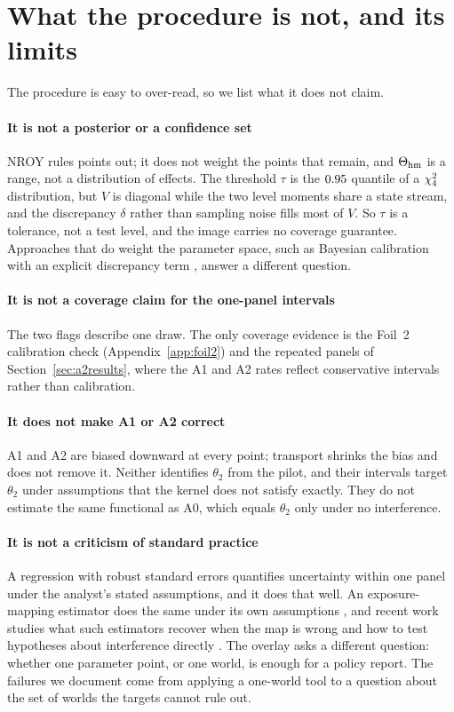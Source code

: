 \section{What the procedure is not, and its limits}\label{sec:limits}

The procedure is easy to over-read, so we list what it does not claim.

\paragraph{It is not a posterior or a confidence set} NROY rules points out; it
does not weight the points that remain, and $\Theta_{\mathrm{hm}}$ is a range, not a
distribution of effects. The threshold $\tau$ is the $0.95$ quantile of a
$\chi^2_{4}$ distribution, but $V$ is diagonal while the two level moments
share a state stream, and the discrepancy $\delta$ rather than sampling noise
fills most of $V$. So $\tau$ is a tolerance, not a test level, and the image
carries no coverage guarantee. Approaches that do weight the parameter space, such
as Bayesian calibration with an explicit discrepancy term \citep{kennedy2001},
answer a different question.

\paragraph{It is not a coverage claim for the one-panel intervals} The two flags
describe one draw. The only coverage evidence is the Foil~2 calibration check
(Appendix~\ref{app:foil2}) and the repeated panels of Section~\ref{sec:a2results},
where the A1 and A2 rates reflect conservative intervals rather than calibration.

\paragraph{It does not make A1 or A2 correct} A1 and A2 are biased downward at
every point; transport shrinks the bias and does not remove it. Neither identifies
$\theta_2$ from the pilot, and their intervals target $\theta_2$ under assumptions
that the kernel does not satisfy exactly. They do not estimate the same functional
as A0, which equals $\theta_2$ only under no interference.

\paragraph{It is not a criticism of standard practice} A regression with robust
standard errors quantifies uncertainty within one panel under the analyst's stated
assumptions, and it does that well. An exposure-mapping estimator does the same
under its own assumptions \citep{aronow2017,leung2020}, and recent work studies
what such estimators recover when the map is wrong \citep{savje2021} and how to
test hypotheses about interference directly \citep{athey2018}. The overlay asks a
different question: whether one parameter point, or one world, is enough for a
policy report. The failures we document come from applying a one-world tool to a
question about the set of worlds the targets cannot rule out.

